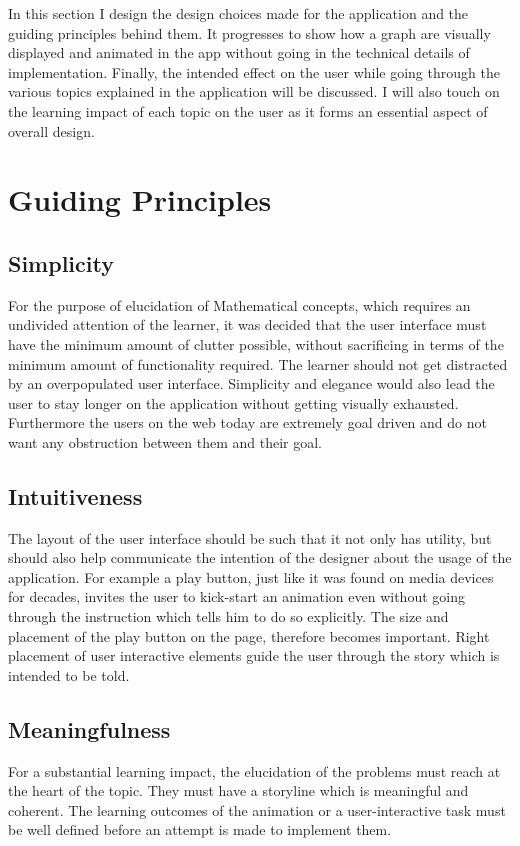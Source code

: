 \graphicspath{ {images/} }

In this section I design the design choices made for the application and the
guiding principles behind them. It progresses to show how a graph are visually
displayed and animated in the app without going in the technical details of
implementation. Finally, the intended effect on the user while going through
the various topics explained in the application will be discussed.  I will
also touch on the learning impact of each topic on the user as it forms an
essential aspect of overall design.

\section{Guiding Principles}

\subsection{Simplicity}
\label{design: simplicity}
For the purpose of elucidation of Mathematical concepts, which requires an
undivided attention of the learner, it was decided that the user interface must
have the minimum amount of clutter possible, without sacrificing in terms of the minimum
amount of functionality required. The learner should not get distracted by an
overpopulated user interface. Simplicity and elegance would also lead the user
to stay longer on the application without getting visually exhausted.
Furthermore the users on the web today are extremely goal driven and do not want any
obstruction between them and their goal. \cite{Karvonen2000}

\subsection{Intuitiveness}
The layout of the user interface should be such that it not only has utility,
but should also help communicate the intention of the designer about the usage
of the application. For example a play button, just like it was found on media
devices for decades, invites the user to kick-start an animation even without
going through the instruction which tells him to do so explicitly. The size and
placement of the play button on the page, therefore becomes important. Right
placement of user interactive elements guide the user through the story which
is intended to be told.

\subsection{Meaningfulness}
For a substantial learning impact, the elucidation of the problems must reach at
the heart of the topic. They must have a storyline which is
meaningful and coherent. The learning outcomes of the animation or a
user-interactive task must be well defined before an attempt is made to
implement them.

